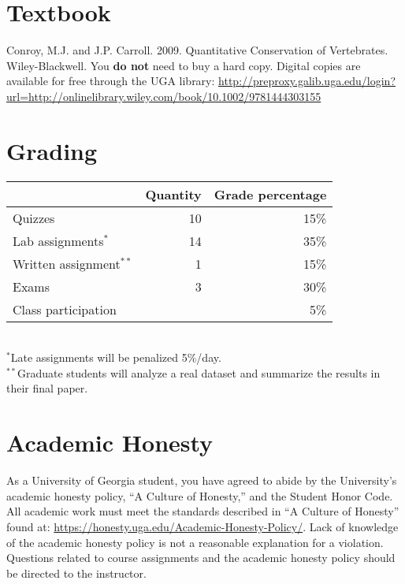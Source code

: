 \documentclass[11pt]{article}
\begin{document}
\vspace{-5mm}
\section*{Textbook}
\vspace{-5mm}
Conroy, M.J. and J.P. Carroll. 2009. Quantitative Conservation of
Vertebrates. Wiley-Blackwell. You {\bf do not} need to buy a hard
copy. Digital copies are available for free through the UGA library:
{\footnotesize \url{http://preproxy.galib.uga.edu/login?url=http://onlinelibrary.wiley.com/book/10.1002/9781444303155}}

\vspace{-5mm}
\section*{Grading}
\vspace{-5mm}
\begin{center}
  \begin{tabular}[h!]{lrr}
    \hline
                                   & Quantity & Grade percentage \\
    \hline
    Quizzes                        & 10       & 15\%             \\
    Lab assignments$^*$            & 14       & 35\%             \\
    Written assignment$^{**}$      & 1        & 15\%             \\
    Exams                          & 3        & 30\%             \\
    Class participation            &          & 5\%              \\
    \hline
  \end{tabular}                                                  \\
  \small
\hspace{0mm} $^*$Late assignments will be penalized 5\%/day.     \\
\hspace{0mm} $^{**}$Graduate students will analyze a real dataset and
summarize the results in their final paper. 
\end{center}



\vspace{-5mm}
\section*{Academic Honesty}
\vspace{-5mm}
As a University of Georgia student, you have agreed to abide by the
University's academic honesty policy, ``A Culture of Honesty,'' and
the Student Honor Code. All academic work must meet the standards
described in ``A Culture of Honesty'' found at:
\url{https://honesty.uga.edu/Academic-Honesty-Policy/}. Lack of
knowledge of the academic honesty policy is not a reasonable
explanation for a violation. Questions related to course assignments
and the academic honesty policy should be directed to the instructor.  
\end{document}
